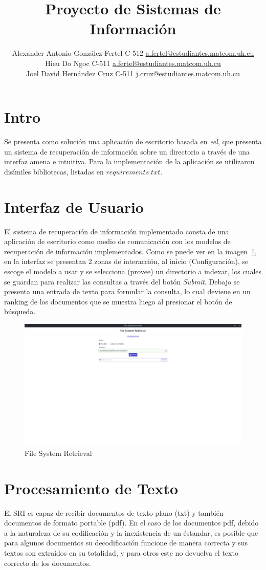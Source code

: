 \documentclass[a4paper, 10pt]{article}
\title{Proyecto de Sistemas de Información}
\author{Alexander Antonio González Fertel C-512 \hfill
		\href{mailto:a.fertel@estudiantes.matcom.uh.cu}{a.fertel@estudiantes.matcom.uh.cu}\\
		Hieu Do Ngoc C-511 \hfill
		\href{mailto:a.fertel@estudiantes.matcom.uh.cu}{a.fertel@estudiantes.matcom.uh.cu}\\
		Joel David Hernández Cruz C-511 \hfill
		\href{mailto:j.cruz@estudiantes.matcom.uh.cu}{j.cruz@estudiantes.matcom.uh.cu}}
\date{}
\begin{document}
	\maketitle
	\section{Intro}
	Se presenta como solución una aplicación de escritorio basada en \textit{eel}, que presenta un sistema
	de recuperación de información sobre un directorio a través de una interfaz amena e intuitiva.
	Para la implementación de la aplicación se utilizaron disímiles bibliotecas, listadas en $requirements.txt$. 

	\section{Interfaz de Usuario}
	El sistema de recuperación de información implementado consta de una aplicación de escritorio como medio de comunicación con los modelos
	de recuperación de información implementados. Como se puede ver en la imagen~\ref{fig:1}, en la interfaz se presentan 2 zonas de 
	interacción, al inicio (Configuración), se escoge el modelo a usar y se selecciona (provee) un directorio a indexar, los cuales
	se guardan para realizar las consultas a través del botón \textit{Submit}. Debajo se presenta una entrada
	de texto para formular la consulta, lo cual deviene en un ranking de los documentos que se muestra luego al presionar el botón
	de búsqueda.

	\begin{figure}[h]
		\centering
		\includegraphics[width=.6\textwidth]{images/app.png}			
		\caption{File System Retrieval}
		\label{fig:1}	
	\end{figure}

	\section{Procesamiento de Texto}
	El SRI es capaz de recibir documentos de texto plano (txt) y tambi\'en documentos de formato portable (pdf). En el caso de los documentos pdf, debido a la naturaleza de su codificaci\'on y la inexistencia de un \'estandar, es posible que para algunos documentos su decodificaci\'on funcione de manera correcta y sus textos son extra\'idos en su totalidad, y para otros este no devuelva el texto correcto de los documentos.
\end{document}
